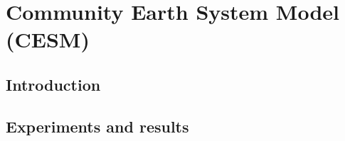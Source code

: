 \section{Community Earth System Model (CESM)}

\subsection{Introduction}

\subsection{Experiments and results}




